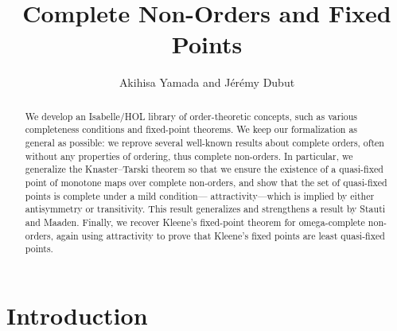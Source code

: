 \documentclass[11pt,a4paper]{article}
\begin{document}
\title{Complete Non-Orders and Fixed Points}
\author{Akihisa Yamada and Jérémy Dubut}
\maketitle

\begin{abstract}
  We develop an Isabelle/HOL library of order-theoretic concepts, such as various completeness conditions and
   fixed-point theorems. We keep our formalization as general as possible: we reprove several well-known results 
   about complete orders, often without any properties of ordering, thus complete non-orders. In particular, we 
   generalize the Knaster--Tarski theorem so that we ensure the existence of a quasi-fixed point of monotone maps 
   over complete non-orders, and show that the set of quasi-fixed points is complete under a mild condition---%
   attractivity---which is implied by either antisymmetry or transitivity. This result generalizes and strengthens a result
    by Stauti and Maaden. Finally, we recover Kleene's fixed-point theorem for omega-complete non-orders, again 
    using attractivity to prove that Kleene's fixed points are least quasi-fixed points.
\end{abstract}

\tableofcontents

\section{Introduction}
\end{document}
